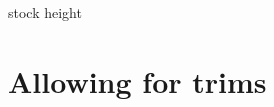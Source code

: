 \ifdim\stockheight=0pt\addtolength\stockheight{\paperheight}\fi
\addtolength\stockheight{3mm}


\ifdim\stockwidth=0pt\addtolength\stockwidth{\paperwidth}\fi
\addtolength\stockwidth{3mm}

stock height\the\stockheight\\
\the\stockwidth

\newlength\lefttrim
\newlength\bottomtrim
\setlength\lefttrim{0mm}
\setlength\bottomtrim{0mm}

\setlength\trimtop{5mm}
\setlength\trimedge{10mm}

\lipsum[1]

\printlayout
\newpage

\section{Allowing for trims}
\newpage

